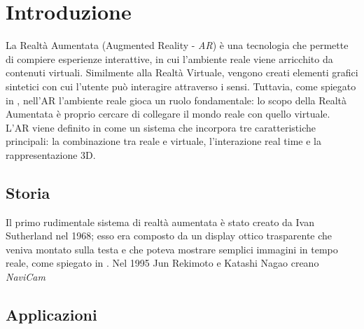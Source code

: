 \documentclass[crop=false, class=book]{standalone}
\begin{document}
	\chapter{Introduzione}
	La Realtà Aumentata (Augmented Reality - \emph{AR}) è una tecnologia che permette di compiere esperienze interattive, in cui l'ambiente reale viene arricchito da contenuti virtuali. Similmente alla Realtà Virtuale, vengono creati elementi grafici sintetici con cui l'utente può interagire attraverso i sensi. Tuttavia, come spiegato in \cite{bimber2005spatial}, nell'AR l'ambiente reale gioca un ruolo fondamentale: lo scopo della Realtà Aumentata è proprio cercare di collegare il mondo reale con quello virtuale.
	\\
	L'AR viene definito in \cite{azuma1997survey} come un sistema che incorpora tre caratteristiche principali: la combinazione tra reale e virtuale, l'interazione real time e la rappresentazione 3D. 
	\section{Storia}
	Il primo rudimentale sistema di realtà aumentata è stato creato da Ivan Sutherland nel 1968; esso era composto da un display ottico trasparente che veniva montato sulla testa e che poteva mostrare semplici immagini in tempo reale, come spiegato in \cite{sutherland1968head}. Nel 1995 Jun Rekimoto e Katashi Nagao creano \textit{NaviCam}
	
	\section{Applicazioni}	
	
	
\end{document}

